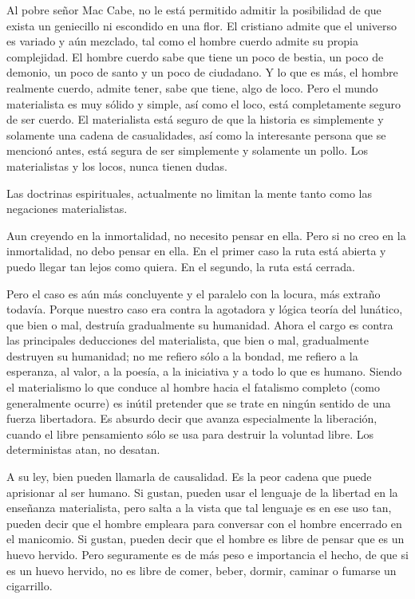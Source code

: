 Al pobre señor Mac Cabe, no le está permitido admitir la posibilidad de que exista un geniecillo ni
escondido en una flor. El cristiano admite que el universo es variado y aún mezclado, tal como el hombre
cuerdo admite su propia complejidad. El hombre cuerdo sabe que tiene un poco de bestia, un poco de
demonio, un poco de santo y un poco de ciudadano. Y lo que es más, el hombre realmente cuerdo, admite
tener, sabe que tiene, algo de loco. Pero el mundo materialista es muy sólido y simple, así como el loco,
está completamente seguro de ser cuerdo. El materialista está seguro de que la historia es simplemente y
solamente una cadena de casualidades, así como la interesante persona que se mencionó antes, está segura
de ser simplemente y solamente un pollo. Los materialistas y los locos, nunca tienen dudas.

Las doctrinas espirituales, actualmente no limitan la mente tanto como las negaciones materialistas.

Aun creyendo en la inmortalidad, no necesito pensar en ella. Pero si no creo en la inmortalidad, no debo
pensar en ella. En el primer caso la ruta está abierta y puedo llegar tan lejos como quiera. En el segundo,
la ruta está cerrada.

Pero el caso es aún más concluyente y el paralelo con la locura, más extraño todavía. Porque
nuestro caso era contra la agotadora y lógica teoría del lunático, que bien o mal, destruía gradualmente su
humanidad. Ahora el cargo es contra las principales deducciones del materialista, que bien o mal,
gradualmente destruyen su humanidad; no me refiero sólo a la bondad, me refiero a la esperanza, al valor,
a la poesía, a la iniciativa y a todo lo que es humano. Siendo el materialismo lo que conduce al hombre
hacia el fatalismo completo (como generalmente ocurre) es inútil pretender que se trate en ningún sentido
de una fuerza libertadora. Es absurdo decir que avanza especialmente la liberación, cuando el libre
pensamiento sólo se usa para destruir la voluntad libre. Los deterministas atan, no desatan.

A su ley, bien pueden llamarla  de causalidad. Es la peor cadena que puede aprisionar al
ser humano. Si gustan, pueden usar el lenguaje de la libertad en la enseñanza materialista, pero salta a la
vista que tal lenguaje es en ese uso tan, pueden decir que el hombre empleara para conversar con el
hombre encerrado en el manicomio. Si gustan, pueden decir que el hombre es libre de pensar que es un
huevo hervido. Pero seguramente es de más peso e importancia el hecho, de que si es un huevo hervido,
no es libre de comer, beber, dormir, caminar o fumarse un cigarrillo.

